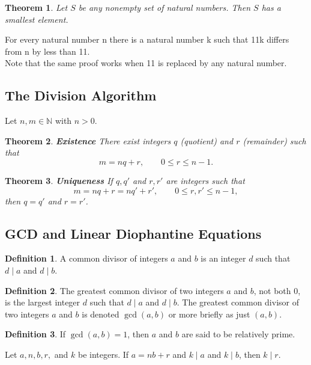 \documentclass{article}
\newtheorem*{theorem*}{Theorem}
\theoremstyle{definition}
\newtheorem*{definition*}{Definition}
\newenvironment{manualtheorem}[1]{%
  \renewcommand{\thetheorem}{#1}%
  \theorem%
}{%
  \endtheorem%
}
\begin{document}
\begin{theorem*}
	Let $S$ be any nonempty set of natural numbers. Then $S$ has a smallest element.
\end{theorem*}

\begin{manualtheorem}{1.27}
	For every natural number n there is a natural number k such that 11k
	differs from n by less than 11. \\Note that the same proof works when 11 is replaced by any natural number.
\end{manualtheorem}

\subsection{The Division Algorithm}
Let $n, m \in \mathbb{N}$ with $n > 0$.
\begin{theorem*}
	\textbf{Existence}
	There exist integers $q$ (quotient) and $r$ (remainder) such that
	\[
		m = nq + r, \qquad 0 \leq r \leq n - 1.
	\]
\end{theorem*}

\begin{theorem*}
	\textbf{Uniqueness}
	If $q, q'$ and $r, r'$ are integers such that
	\[
		m = nq + r = nq' + r', \qquad 0 \leq r, r' \leq n - 1,
	\]
	then $q = q'$ and $r = r'$.
\end{theorem*}


\subsection{GCD and Linear Diophantine Equations}

\begin{definition*}
	A common divisor of integers $a$ and $b$ is an integer $d$ such that $d \mid a$ and $d \mid b$.
\end{definition*}

\begin{definition*}
	The greatest common divisor of two integers $a$ and $b$, not both $0$, is the largest integer $d$ such that $d \mid a$ and $d \mid b$. The greatest common divisor of two integers $a$ and $b$ is denoted $\gcd(a, b)$ or more briefly as just $(a, b)$.
\end{definition*}

\begin{definition*}
	If $\gcd(a, b) = 1$, then $a$ and $b$ are said to be relatively prime.
\end{definition*}
\begin{manualtheorem}{1.32}
	Let $a, n, b, r,$ and $k$ be integers. If $a = nb + r$ and $k \mid a$ and $k \mid b$,
	then $k \mid r$.
\end{manualtheorem}
\end{document}
